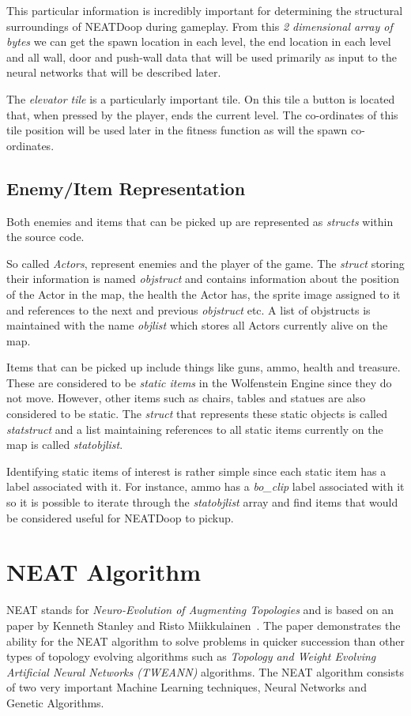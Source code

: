 \documentclass[]{Learning-to-Play-Wolfenstein-thesis}
\begin{document}
This particular information is incredibly important for determining the structural surroundings of NEATDoop during gameplay. From this \textit{2 dimensional array of bytes} we can get the spawn location in each level, the end location in each level and all wall, door and push-wall data that will be used primarily as input to the neural networks that will be described later. 

The \textit{elevator tile} is a particularly important tile. On this tile a button is located that, when pressed by the player, ends the current level. The co-ordinates of this tile position will be used later in the fitness function as will the spawn co-ordinates. 

\subsection{Enemy/Item Representation}
Both enemies and items that can be picked up are represented as \textit{structs} within the source code. 

So called \textit{Actors}, represent enemies and the player of the game. The \textit{struct} storing their information is named \textit{objstruct} and contains information about the position of the Actor in the map, the health the Actor has, the sprite image assigned to it and references to the next and previous \textit{objstruct} etc. A list of objstructs is maintained with the name \textit{objlist} which stores all Actors currently alive on the map.

Items that can be picked up include things like guns, ammo, health and treasure. These are considered to be \textit{static items} in the Wolfenstein Engine since they do not move. However, other items such as chairs, tables and statues are also considered to be static. The \textit{struct} that represents these static objects is called \textit{statstruct} and a list maintaining references to all static items currently on the map is called \textit{statobjlist}.

Identifying static items of interest is rather simple since each static item has a label associated with it. For instance, ammo has a \textit{bo\_clip} label associated with it so it is possible to iterate through the \textit{statobjlist} array and find items that would be considered useful for NEATDoop to pickup. 

\section{NEAT Algorithm}
NEAT stands for \textit{Neuro-Evolution of Augmenting Topologies} and is based on an paper by Kenneth Stanley and Risto Miikkulainen~\cite{NEAT:2002}. The paper demonstrates the ability for the NEAT algorithm to solve problems in quicker succession than other types of topology evolving algorithms such as \textit{Topology and Weight Evolving Artificial Neural Networks (TWEANN)} algorithms. The NEAT algorithm consists of two very important Machine Learning techniques, Neural Networks and Genetic Algorithms.\\\\
\end{document}
